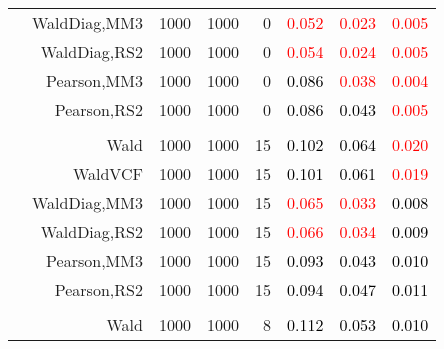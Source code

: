 \documentclass[
]{article}
\begin{document}
\begin{table}[H]
{\begin{tabular}[t]{lrrrrrrr}
\hspace{1em} & WaldDiag,MM3 & 1000 & 1000 & 0 & \textcolor{red}{0.052} & \textcolor{red}{0.023} & \textcolor{red}{0.005}\\

\hspace{1em} & WaldDiag,RS2 & 1000 & 1000 & 0 & \textcolor{red}{0.054} & \textcolor{red}{0.024} & \textcolor{red}{0.005}\\

\hspace{1em} & Pearson,MM3 & 1000 & 1000 & 0 & \textcolor{black}{0.086} & \textcolor{red}{0.038} & \textcolor{red}{0.004}\\

\hspace{1em} & Pearson,RS2 & 1000 & 1000 & 0 & \textcolor{black}{0.086} & \textcolor{black}{0.043} & \textcolor{red}{0.005}\\
\cmidrule{1-8}
\addlinespace[0.3em]
\multicolumn{8}{l}{\textbf{1F 15V}}\\
\hspace{1em} & Wald & 1000 & 1000 & 15 & \textcolor{black}{0.102} & \textcolor{black}{0.064} & \textcolor{red}{0.020}\\

\hspace{1em} & WaldVCF & 1000 & 1000 & 15 & \textcolor{black}{0.101} & \textcolor{black}{0.061} & \textcolor{red}{0.019}\\

\hspace{1em} & WaldDiag,MM3 & 1000 & 1000 & 15 & \textcolor{red}{0.065} & \textcolor{red}{0.033} & \textcolor{black}{0.008}\\

\hspace{1em} & WaldDiag,RS2 & 1000 & 1000 & 15 & \textcolor{red}{0.066} & \textcolor{red}{0.034} & \textcolor{black}{0.009}\\

\hspace{1em} & Pearson,MM3 & 1000 & 1000 & 15 & \textcolor{black}{0.093} & \textcolor{black}{0.043} & \textcolor{black}{0.010}\\

\hspace{1em} & Pearson,RS2 & 1000 & 1000 & 15 & \textcolor{black}{0.094} & \textcolor{black}{0.047} & \textcolor{black}{0.011}\\
\cmidrule{1-8}
\addlinespace[0.3em]
\multicolumn{8}{l}{\textbf{2F 10V}}\\
\hspace{1em} & Wald & 1000 & 1000 & 8 & \textcolor{black}{0.112} & \textcolor{black}{0.053} & \textcolor{black}{0.010}\\


\end{tabular}}
\end{table}
\end{document}
